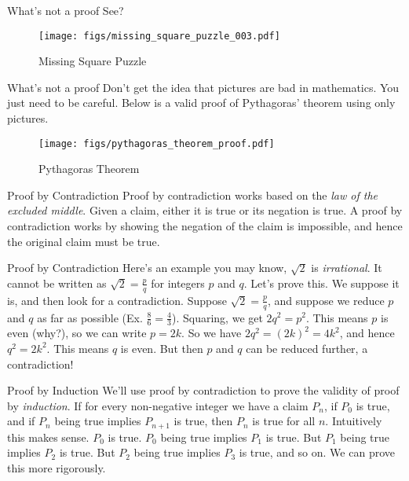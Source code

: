 \documentclass{beamer}
\begin{document}
    \begin{frame}{What's not a proof}
        See?
        \begin{figure}
            \centering
            \texttt{[image: figs/missing\_square\_puzzle\_003.pdf]}
            \caption{Missing Square Puzzle}
            \label{fig:missing_square_puzzle_003}
        \end{figure}
    \end{frame}
    \begin{frame}{What's not a proof}
        Don't get the idea that pictures are bad in mathematics. You just need to be careful.
        Below is a valid proof of Pythagoras' theorem using only pictures.
        \begin{figure}
            \centering
            \texttt{[image: figs/pythagoras\_theorem\_proof.pdf]}
            \caption{Pythagoras Theorem}
            \label{fig:pythagoras_theorem_proof}
        \end{figure}
    \end{frame}
    \begin{frame}{Proof by Contradiction}
        Proof by contradiction works based on the
        \textit{law of the excluded middle}. Given a claim, either it is
        true or its negation is true. A proof by contradiction works by showing the
        negation of the claim is impossible, and hence the original claim must be true.
    \end{frame}
    \begin{frame}{Proof by Contradiction}
        Here's an example you may know, $\sqrt{2}$ is \textit{irrational}. It cannot be written as
        $\sqrt{2}=\frac{p}{q}$ for integers $p$ and $q$. Let's prove this. We suppose it is, and then
        look for a contradiction. Suppose $\sqrt{2}=\frac{p}{q}$, and suppose we reduce $p$ and $q$
        as far as possible (Ex. $\frac{8}{6}=\frac{4}{3}$). Squaring, we get
        $2q^{2}=p^{2}$. This means $p$ is even (why?), so we can write $p=2k$. So we have
        $2q^{2}=(2k)^{2}=4k^{2}$, and hence $q^{2}=2k^{2}$. This means $q$ is even. But then
        $p$ and $q$ can be reduced further, a contradiction!
    \end{frame}
    \begin{frame}{Proof by Induction}
        We'll use proof by contradiction to prove the validity of
        proof by \textit{induction}. If for every non-negative integer
        we have a claim $P_{n}$, if $P_{0}$ is true, and if $P_{n}$ being true
        implies $P_{n+1}$ is true, then $P_{n}$ is true for all $n$. Intuitively this makes
        sense. $P_{0}$ is true. $P_{0}$ being true implies $P_{1}$ is true. But $P_{1}$ being
        true implies $P_{2}$ is true. But $P_{2}$ being true implies $P_{3}$ is true, and so on.
        We can prove this more rigorously.
    \end{frame}
\end{document}
